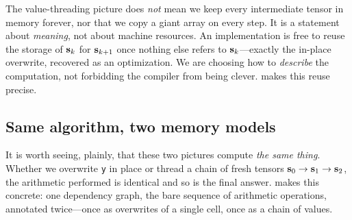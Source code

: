 \begin{pitfall}
The value-threading picture does \emph{not} mean we keep every intermediate
tensor in memory forever, nor that we copy a giant array on every step. It is a
statement about \emph{meaning}, not about machine resources. An implementation is
free to reuse the storage of $\mathbf{s}_k$ for $\mathbf{s}_{k+1}$ once nothing else refers to
$\mathbf{s}_k$---exactly the in-place overwrite, recovered as an optimization. We are
choosing how to \emph{describe} the computation, not forbidding the compiler from
being clever.  makes this reuse precise.
\end{pitfall}

\subsection{Same algorithm, two memory models}

It is worth seeing, plainly, that these two pictures compute \emph{the same
thing}. Whether we overwrite \texttt{y} in place or thread a chain of fresh
tensors $\mathbf{s}_0 \to \mathbf{s}_1 \to \mathbf{s}_2$, the arithmetic performed is identical and so
is the final answer.  makes this concrete: one dependency
graph, the bare sequence of arithmetic operations, annotated twice---once as
overwrites of a single cell, once as a chain of values.

